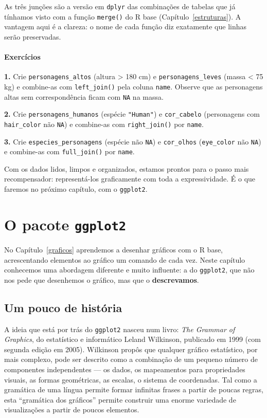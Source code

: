 \documentclass[
  portuguese,
  11pt,
  openany]{book}
\begin{document}
As três junções são a versão em \texttt{dplyr} das combinações de tabelas que já tínhamos
visto com a função \texttt{merge()} do R base (Capítulo~\ref{estruturas}). A vantagem aqui é
a clareza: o nome de cada função diz exatamente que linhas serão preservadas.

\subsubsection{Exercícios}\label{exercuxedcios-20}

\textbf{1.} Crie \texttt{personagens\_altos} (altura \textgreater{} 180 cm) e \texttt{personagens\_leves} (massa \textless{} 75 kg)
e combine-as com \texttt{left\_join()} pela coluna \texttt{name}. Observe que as personagens altas sem
correspondência ficam com \texttt{NA} na massa.

\textbf{2.} Crie \texttt{personagens\_humanos} (espécie \texttt{"Human"}) e \texttt{cor\_cabelo} (personagens com
\texttt{hair\_color} não \texttt{NA}) e combine-as com \texttt{right\_join()} por \texttt{name}.

\textbf{3.} Crie \texttt{especies\_personagens} (espécie não \texttt{NA}) e \texttt{cor\_olhos} (\texttt{eye\_color} não
\texttt{NA}) e combine-as com \texttt{full\_join()} por \texttt{name}.

Com os dados lidos, limpos e organizados, estamos prontos para o passo mais
recompensador: representá-los graficamente com toda a expressividade. É o que faremos no
próximo capítulo, com o \texttt{ggplot2}.

\chapter{\texorpdfstring{O pacote \texttt{ggplot2}}{O pacote ggplot2}}\label{ggplot}

No Capítulo~\ref{graficos} aprendemos a desenhar gráficos com o R base, acrescentando
elementos ao gráfico um comando de cada vez. Neste capítulo conhecemos uma abordagem
diferente e muito influente: a do \texttt{ggplot2}, que não nos pede que desenhemos o gráfico,
mas que o \textbf{descrevamos}.

\section{Um pouco de história}\label{um-pouco-de-histuxf3ria}

A ideia que está por trás do \texttt{ggplot2} nasceu num livro: \emph{The Grammar of Graphics}, do
estatístico e informático Leland Wilkinson, publicado em 1999 (com segunda edição em
2005). Wilkinson propôs que qualquer gráfico estatístico, por mais complexo, pode ser
descrito como a combinação de um pequeno número de componentes independentes --- os
dados, os mapeamentos para propriedades visuais, as formas geométricas, as escalas, o
sistema de coordenadas. Tal como a gramática de uma língua permite formar infinitas
frases a partir de poucas regras, esta ``gramática dos gráficos'' permite construir uma
enorme variedade de visualizações a partir de poucos elementos.
\end{document}
